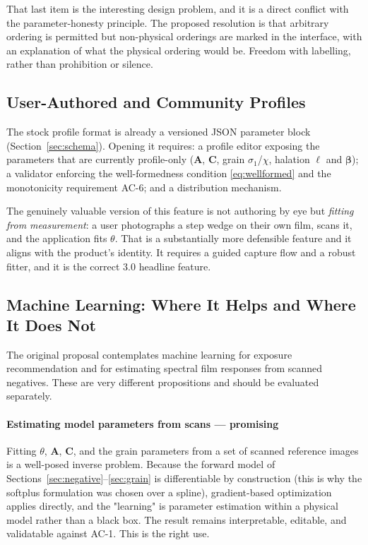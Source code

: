 That last item is the interesting design problem, and it is a direct conflict
with the parameter-honesty principle. The proposed resolution is that arbitrary
ordering is permitted but non-physical orderings are marked in the interface,
with an explanation of what the physical ordering would be. Freedom with
labelling, rather than prohibition or silence.

\subsection{User-Authored and Community Profiles}

The stock profile format is already a versioned JSON parameter block
(Section~\ref{sec:schema}). Opening it requires: a profile editor exposing the
parameters that are currently profile-only ($\mathbf{A}$, $\mathbf{C}$, grain
$\sigma_1$/$\chi$, halation $\ell$ and $\boldsymbol{\beta}$); a validator
enforcing the well-formedness condition \eqref{eq:wellformed} and the
monotonicity requirement AC-6; and a distribution mechanism.

The genuinely valuable version of this feature is not authoring by eye but
\emph{fitting from measurement}: a user photographs a step wedge on their own
film, scans it, and the application fits $\theta$. That is a substantially more
defensible feature and it aligns with the product's identity. It requires a
guided capture flow and a robust fitter, and it is the correct 3.0 headline
feature.

\subsection{Machine Learning: Where It Helps and Where It Does Not}

The original proposal contemplates machine learning for exposure recommendation
and for estimating spectral film responses from scanned negatives. These are
very different propositions and should be evaluated separately.

\paragraph{Estimating model parameters from scans --- promising} Fitting
$\theta$, $\mathbf{A}$, $\mathbf{C}$, and the grain parameters from a set of
scanned reference images is a well-posed inverse problem. Because the forward
model of Sections~\ref{sec:negative}--\ref{sec:grain} is differentiable by
construction (this is why the softplus formulation was chosen over a spline),
gradient-based optimization applies directly, and the "learning" is parameter
estimation within a physical model rather than a black box. The result remains
interpretable, editable, and validatable against AC-1. This is the right use.

